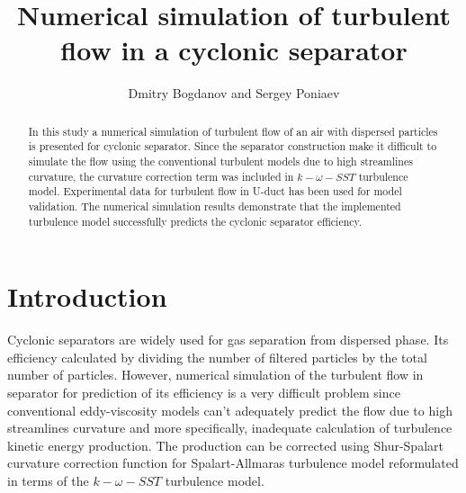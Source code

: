 \documentclass[a4paper]{jpconf}
\begin{document}

\title{Numerical simulation of turbulent flow in a cyclonic separator}

\author{Dmitry Bogdanov and Sergey Poniaev}

\address{Division of Plasma Physics, Atomic Physics and Astrophysics, Ioffe Physical Technical Institute, 26 Polytekhnicheskaya, St Petersburg 194021, Russian Federation}


\begin{abstract}
In this study a numerical simulation of turbulent flow of an air with dispersed particles is presented for cyclonic separator. Since the separator construction make it difficult to simulate the flow using the conventional turbulent models due to high streamlines curvature, the curvature correction term was included in $k-\omega-SST$ turbulence model. Experimental data for turbulent flow in U-duct has been used for model validation. The numerical simulation results demonstrate that the implemented turbulence model successfully predicts the cyclonic separator efficiency.
\end{abstract}

\section{Introduction}
Cyclonic separators are widely used for gas separation from dispersed phase. Its efficiency calculated by dividing the number of filtered particles by the total number of particles. However, numerical simulation of the turbulent flow in separator for prediction of its efficiency is a very difficult problem since conventional eddy-viscosity models can't adequately predict the flow\cite{ShurSpallart} due to high streamlines curvature and more specifically, inadequate calculation of turbulence kinetic energy production. The production can be corrected using Shur-Spalart curvature correction function for Spalart-Allmaras turbulence model reformulated\cite{Smirnov} in terms of the $k-\omega-SST$ turbulence model.
\end{document}
